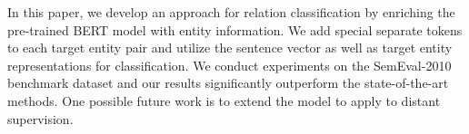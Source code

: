 \documentclass[11pt]{article}
\begin{document}
In this paper, we develop an approach for relation classification by
enriching the pre-trained BERT model
with entity information. We add special separate tokens
to each target entity pair and utilize the sentence vector
as well as target entity representations for classification. We 
conduct experiments on the SemEval-2010 benchmark dataset
and our results significantly outperform the state-of-the-art methods.
One possible future work is to extend the model to apply to 
distant supervision.  
  



\end{document}
